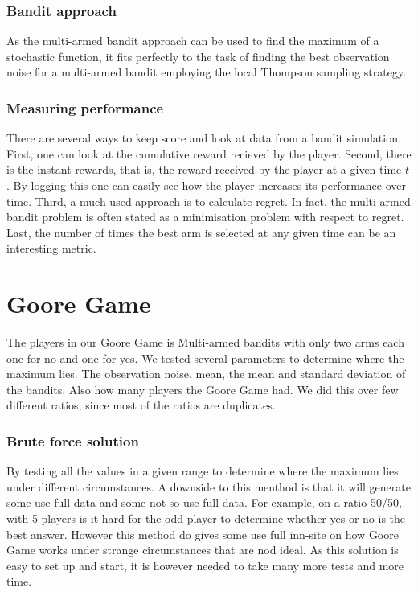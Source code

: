 \subsubsection{Bandit approach}

As the multi-armed bandit approach can be used to find the maximum of a
stochastic function, it fits perfectly to the task of finding the best
observation noise for a multi-armed bandit employing the local Thompson
sampling strategy.

\subsubsection{Measuring performance}

There are several ways to keep score and look at data from a bandit simulation.
First, one can look at the cumulative reward recieved by the player.
Second, there is the instant rewards, that is, the reward received by the player at a given time $t$.
By logging this one can easily see how the player increases its performance over time.
Third, a much used approach is to calculate regret.
In fact, the multi-armed bandit problem is often stated as a minimisation problem with respect to regret.
Last, the number of times the best arm is selected at any given time can be an interesting metric.


\section{Goore Game}
The players in our Goore Game is Multi-armed bandits with only two arms each one for no and one for yes.
We tested several parameters to determine where the maximum lies. The observation noise, mean, the mean
and standard deviation of the bandits. Also how many players the Goore Game had. We did this over few different
ratios, since most of the ratios are duplicates. 

\subsubsection{Brute force solution}
By testing all the values in a given range to determine where the maximum lies under different
circumstances. A downside to this menthod is that it will generate some use full data and some not so
use full data. For example, on a ratio 50/50, with 5 players is it hard for the  odd player to 
determine whether yes or no is the best answer. However this method do gives some use full inn-site on
how Goore Game works under strange circumstances that are nod ideal. As this solution is easy to set
up and start, it is however needed to take many more tests and more time.


